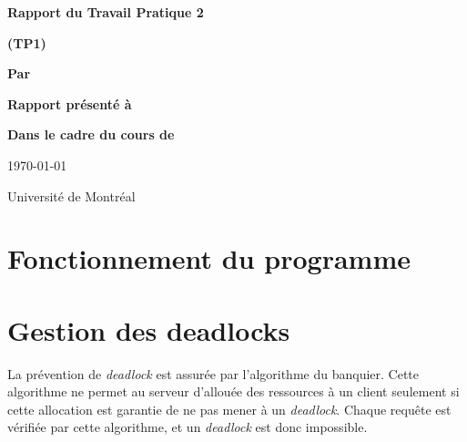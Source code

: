 \documentclass[letterpaper,12pt]{scrartcl}
\begin{document}
	\begin{center}
		\vspace{2cm}

		{\Huge\bf\sf Rapport du Travail Pratique 2}

		\vspace{0.5cm}

		{\bf\sf (TP1)}

		\vspace{4cm}

		{\bf\sf Par}

		\vspace{0.5cm}{\large\bf\sf Charles Langlois et François Poitras}

		\vspace{2cm}

		{\bf\sf Rapport présenté à}

		\vspace{0.5cm}{\large\bf\sf M. Stefan Monnier}

		\vspace{2cm}

		{\bf\sf Dans le cadre du cours de}

		\vspace{0.5cm}{\large\bf\sf Systèmes d'exploitation (IFT2245)}

		\vspace{\fill}
		\today

		\vspace{0.5cm}Université de Montréal
	\end{center}
	
	\newpage

	\pagestyle{cb}
	
	\tableofcontents

	\newpage
\section{Fonctionnement du programme}
\section{Gestion des deadlocks}
La prévention de \emph{deadlock} est assurée par l'algorithme du banquier.
Cette algorithme ne permet au serveur d'allouée des ressources à un client seulement si cette allocation est garantie de ne pas mener à un \emph{deadlock}.
Chaque requête est vérifiée par cette algorithme, et un \emph{deadlock} est donc impossible.
\end{document}
